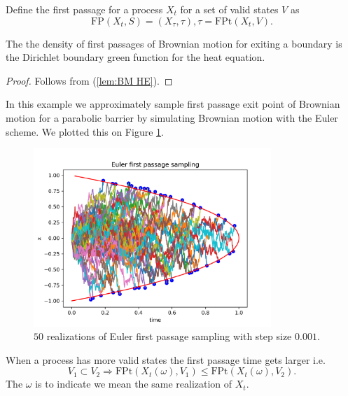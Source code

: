 \documentclass[a4paper,12pt]{article}
\begin{document}
\begin{definition} \label{def:first passage}
    Define the first passage for a process $X_{t}$ for a set of valid states
    $V$ as
    \begin{equation}
        \text{FP}(X_{t},S)=(X_{\tau},\tau), \tau = \text{FPt}(X_{t},V)
        .
    \end{equation}
\end{definition}

\begin{theorem}
    The the density of first passages of Brownian motion for  exiting a  boundary is  the
    Dirichlet boundary green function for the heat equation.
\end{theorem}

\begin{proof}
    Follows from (\ref{lem:BM HE}).
\end{proof}

\begin{example}
    In this example we approximately sample first passage exit point of Brownian motion
    for a parabolic barrier by simulating Brownian motion with the Euler scheme. We plotted
    this on Figure \ref{fig:Euler first passage para}.

    \begin{figure}[ht!]
        \centering
        \includegraphics[width=0.8\textwidth]{plots/Euler first passage para.png}
        \caption{ $50$ realizations of Euler first passage sampling with step size $0.001$.}
        \label{fig:Euler first passage para}
    \end{figure}
\end{example}

\begin{lemma} \label{lem: FP order}
    When a process has more valid states the first passage time gets larger i.e.
    \begin{equation}
        V_{1} \subset V_{2} \Rightarrow
        \text{FPt}(X_{t}(\omega),V_{1}) \le  \text{FPt}(X_{t}(\omega),V_{2}) .
    \end{equation}
    The $\omega$ is to indicate we mean the same realization of $X_{t}$.
\end{lemma}
\end{document}
